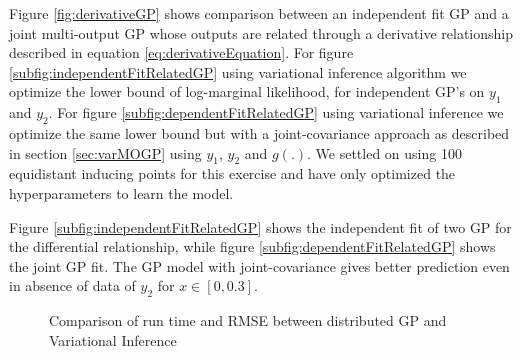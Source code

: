 Figure \ref{fig:derivativeGP} shows comparison between an independent fit GP and a joint multi-output GP whose outputs are related through a derivative relationship described in equation \ref{eq:derivativeEquation}. For figure \ref{subfig:independentFitRelatedGP} using variational inference algorithm we optimize the lower bound of log-marginal likelihood, for independent GP's on \(y_{1}\) and \(y_{2}\). For figure \ref{subfig:dependentFitRelatedGP} using variational inference we optimize the same lower bound but with a joint-covariance approach as described in section \ref{sec:varMOGP} using \(y_{1}\), \(y_{2}\) and \(g(.)\). We settled on using 100 equidistant inducing points for this exercise \cite{icpram16Ankit} and have only optimized the hyperparameters to learn the model. 

Figure \ref{subfig:independentFitRelatedGP} shows the independent fit of two GP for the differential relationship, while figure \ref{subfig:dependentFitRelatedGP} shows the joint GP fit. The GP model with joint-covariance gives better prediction even in absence of data of \(y_{2}\) for \(x \in [0, 0.3]\).

\begin{figure}[!ht]
  \centering
  \quad
  
  \caption{Comparison of run time and RMSE between distributed GP and Variational Inference}\label{fig:comparisonOfDGPvsVARGP}
\end{figure}

